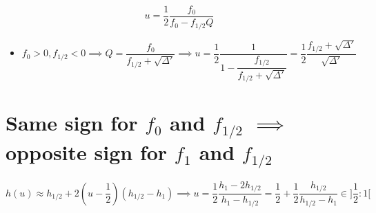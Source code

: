 \documentclass[aps,12pt]{revtex4}
\begin{document}
 $$
 	u =  \frac{1}{2}\dfrac{f_0}{f_0 - f_{1/2}Q}
 $$
 
 \begin{itemize}
 \item 
 $$
 	f_0>0, f_{1/2}<0 \implies Q = \frac{f_0}{f_{1/2}+\sqrt{\Delta'}} 
	\implies u = \dfrac{1}{2} \dfrac{1}{ 1 - \dfrac{f_{1/2}}{f_{1/2}+\sqrt{\Delta'}} } = \dfrac{1}{2} \dfrac{f_{1/2}+\sqrt{\Delta'}}{\sqrt{\Delta'}}
$$
 \end{itemize}
 
 \section{Same sign for $f_0$ and $f_{1/2}$ $\implies$ opposite sign for $f_1$ and $f_{1/2}$}

$$
	h(u) \approx h_{1/2} + 2(u-\dfrac{1}{2})(h_{1/2}-h_1) \implies u = \dfrac{1}{2}\dfrac{h_1 - 2h_{1/2}}{h_1-h_{1/2}}
	= \frac{1}{2} + \frac{1}{2} \dfrac{h_{1/2}}{h_{1/2}-h_1} \in ]\frac{1}{2}:1[
$$
 
  
  
\end{document}
